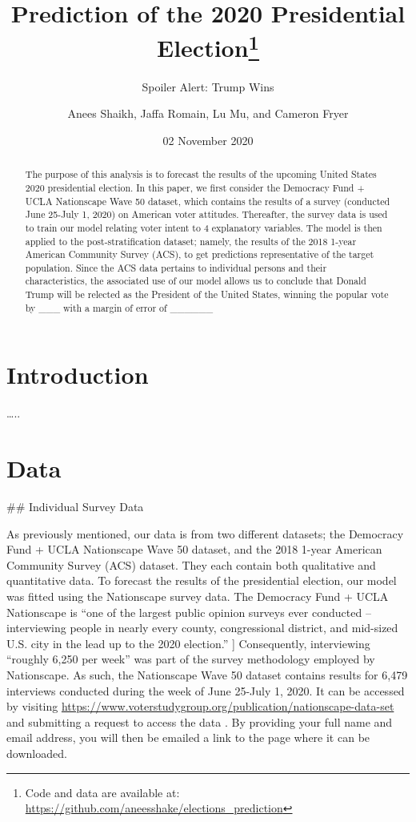 \documentclass[
]{article}
\title{Prediction of the 2020 Presidential Election\thanks{Code and data are available at: \url{https://github.com/aneesshake/elections_prediction}}}
\subtitle{Spoiler Alert: Trump Wins}
\author{Anees Shaikh, Jaffa Romain, Lu Mu, and Cameron Fryer}
\date{02 November 2020}
\begin{document}
\maketitle
\begin{abstract}
The purpose of this analysis is to forecast the results of the upcoming United States 2020 presidential election. In this paper, we first consider the Democracy Fund + UCLA Nationscape Wave 50 dataset, which contains the results of a survey (conducted June 25-July 1, 2020) on American voter attitudes. Thereafter, the survey data is used to train our model relating voter intent to 4 explanatory variables. The model is then applied to the post-stratification dataset; namely, the results of the 2018 1-year American Community Survey (ACS), to get predictions representative of the target population. Since the ACS data pertains to individual persons and their characteristics, the associated use of our model allows us to conclude that Donald Trump will be relected as the President of the United States, winning the popular vote by \_\_\_ with a margin of error of \_\_\_\_\_\_
\end{abstract}

\hypertarget{introduction}{%
\section{Introduction}\label{introduction}}

\ldots..

\hypertarget{data}{%
\section{Data}\label{data}}

\#\# Individual Survey Data

As previously mentioned, our data is from two different datasets; the Democracy Fund + UCLA Nationscape Wave 50 dataset, and the 2018 1-year American Community Survey (ACS) dataset. They each contain both qualitative and quantitative data.
To forecast the results of the presidential election, our model was fitted using the Nationscape survey data. The Democracy Fund + UCLA Nationscape is ``one of the largest public opinion surveys ever conducted -- interviewing people in nearly every county, congressional district, and mid-sized U.S. city in the lead up to the 2020 election.'' \citet{citevavreck_tausanovitch_2020}{]} Consequently, interviewing ``roughly 6,250 per week'' was part of the survey methodology employed by Nationscape. As such, the Nationscape Wave 50 dataset contains results for 6,479 interviews conducted during the week of June 25-July 1, 2020. It can be accessed by visiting \url{https://www.voterstudygroup.org/publication/nationscape-data-set} and submitting a request to access the data \citep{vavreck_tausanovitch_2020}. By providing your full name and email address, you will then be emailed a link to the page where it can be downloaded.
\end{document}
